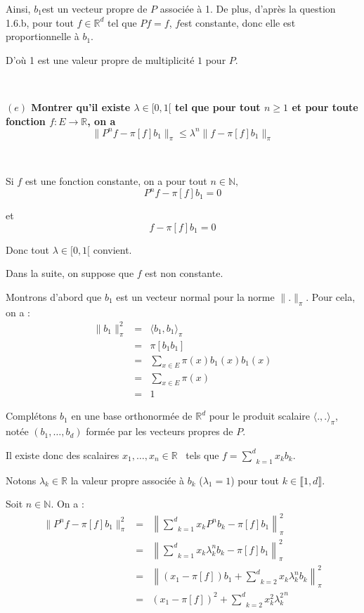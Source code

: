 Ainsi, $b_1 $est un vecteur propre de $P$ associ{\'e}e {\`a} 1. De plus,
d'apr{\`e}s la question 1.6.b, pour tout $f \in \mathbb{R}^d$ tel que $P f =
f$, $f$est constante, donc elle est proportionnelle {\`a} $b_1$.

D'o{\`u} 1 est une valeur propre de multiplicit{\'e} $1$ pour $P$.

\

\textbf{$(e)$ Montrer qu'il existe $\lambda \in [0, 1 [$ tel que pour tout $n \geqslant 1$ et pour toute fonction $f : E \rightarrow \mathbb{R}$, on a
\[ \| P^n f - \pi [f] b_1 \|_{\pi} \leqslant \lambda^n \| f - \pi [f] b_1
   \|_{\pi} \]}

\

Si $f$ est une fonction constante, on a pour tout $n \in \mathbb{N},$
\[ P^n f - \pi [f] b_1 = 0 \]


et
\[ f - \pi [f] b_1 = 0 \]


Donc tout $\lambda \in [0, 1 [$ convient.

Dans la suite, on suppose que $f$ est non constante.

Montrons d'abord que $b_1$ est un vecteur normal pour la norme $\| .
\|_{\pi}$. Pour cela, on a :
\begin{eqnarray*}
  \| b_1 \|^2_{\pi} & = & \langle b_1, b_1 \rangle_{\pi}\\
  & = & \pi [b_1 b_1]\\
  & = & \sum_{x \in E} \pi (x) b_1 (x) b_1 (x)\\
  & = & \sum_{x \in E} \pi (x)\\
  & = & 1
\end{eqnarray*}


Compl{\'e}tons $b_1$ en une base orthonorm{\'e}e de $\mathbb{R}^d$ pour le
produit scalaire $\langle ., . \rangle_{\pi}$, not{\'e}e $(b_1, \ldots, b_d)$
form{\'e}e par les vecteurs propres de $P$.

Il existe donc des scalaires $x_1, \ldots, x_n \in \mathbb{R}$ \ tels que $f =
\underset{k = 1}{\overset{d}{\sum}} x_k b_k$.

Notons $\lambda_k \in \mathbb{R}$ la valeur propre associ{\'e}e {\`a} $b_k$
($\lambda_1 = 1$) pour tout $k \in \llbracket 1, d \rrbracket$.

Soit $n \in \mathbb{N}$. On a :
\begin{eqnarray*}
  \| P^n f - \pi [f] b_1 \|^2_{\pi} & = & \left\| \underset{k =
  1}{\overset{d}{\sum}} x_k P^n b_k - \pi [f] b_1 \right\|^2_{\pi}\\
  & = & \left\| \underset{k = 1}{\overset{d}{\sum}} x_k \lambda_k^n b_k - \pi
  [f] b_1 \right\|^2_{\pi}\\
  & = & \left\| (x_1 - \pi [f]) b_1 + \underset{k = 2}{\overset{d}{\sum}} x_k
  \lambda_k^n b_k \right\|^2_{\pi}\\
  & = & (x_1 - \pi [f])^2 + \underset{k = 2}{\overset{d}{\sum}} x^2_k
  {\lambda^2_k}^n
\end{eqnarray*}


